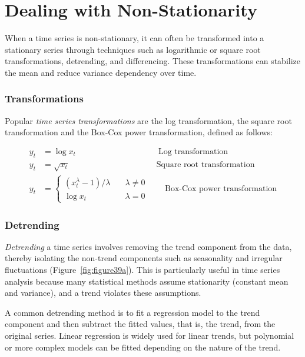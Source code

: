 \section{Dealing with Non-Stationarity}

When a time series is non-stationary, it can often be transformed into a stationary series through techniques such as logarithmic or square root transformations, detrending, and differencing. These transformations can stabilize the mean and reduce variance dependency over time.

\subsubsection*{Transformations}

Popular \emph{time series transformations} are the log transformation, the square root transformation and the Box-Cox power transformation, defined as follows:

\begin{align*}y_t &= \log x_t \qquad \qquad \qquad \qquad \qquad \text{Log transformation}\\
  y_t &= \sqrt{x_t} \qquad \qquad \; \; \qquad \qquad \qquad \text{Square root transformation} \\
  y_t &= \begin{cases}(x_t^\lambda-1)/\lambda &\quad \lambda\neq0 \\
  \log x_t &\quad \lambda=0
  \end{cases} \qquad \text{Box-Cox power transformation}
\end{align*}

\subsubsection*{Detrending}

\emph{Detrending} a time series involves removing the trend component from the data, thereby isolating the non-trend components such as seasonality and irregular fluctuations (Figure~\ref{fig:figure39a}). This is particularly useful in time series analysis because many statistical methods assume stationarity (constant mean and variance), and a trend violates these assumptions.

A common detrending method is to fit a regression model to the trend component and then subtract the fitted values, that is, the trend, from the original series. Linear regression is widely used for linear trends, but polynomial or more complex models can be fitted depending on the nature of the trend.

